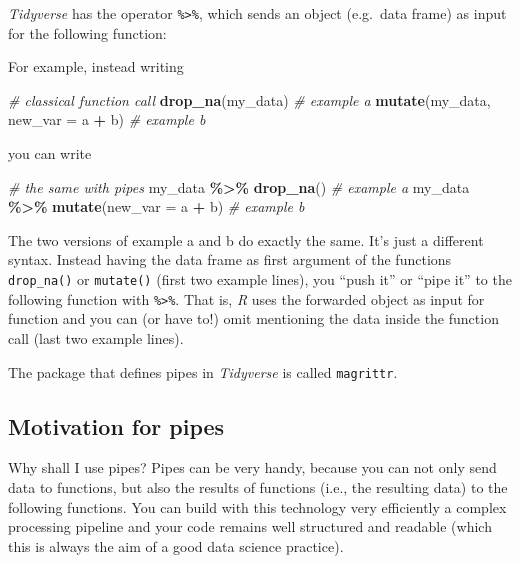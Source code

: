 \documentclass[
]{scrartcl}
\makeatletter
\newenvironment{Shaded}{\begin{snugshade}}{\end{snugshade}}
\newcommand{\AttributeTok}[1]{\textcolor[rgb]{0.13,0.29,0.53}{#1}}
\newcommand{\CommentTok}[1]{\textcolor[rgb]{0.56,0.35,0.01}{\textit{#1}}}
\newcommand{\FunctionTok}[1]{\textcolor[rgb]{0.13,0.29,0.53}{\textbf{#1}}}
\newcommand{\NormalTok}[1]{#1}
\newcommand{\SpecialCharTok}[1]{\textcolor[rgb]{0.81,0.36,0.00}{\textbf{#1}}}
\newenvironment{kframe}{%
\medskip{}
\setlength{\fboxsep}{.8em}
 \def\at@end@of@kframe{}%
 \ifinner\ifhmode%
  \def\at@end@of@kframe{\end{minipage}}%
  \begin{minipage}{\columnwidth}%
 \fi\fi%
 \def\FrameCommand##1{\hskip\@totalleftmargin \hskip-\fboxsep
 \colorbox{shadecolor}{##1}\hskip-\fboxsep
     \hskip-\linewidth \hskip-\@totalleftmargin \hskip\columnwidth}%
 \MakeFramed {\advance\hsize-\width
   \@totalleftmargin\z@ \linewidth\hsize
   \@setminipage}}%
 {\par\unskip\endMakeFramed%
 \at@end@of@kframe}
\newenvironment{rmdblock}[1]
  {
  \begin{itemize}
  \renewcommand{\labelitemi}{
    \raisebox{-.7\height}[0pt][0pt]{
      {\setkeys{Gin}{width=3em,keepaspectratio}\texttt{[image: images/\#1]}}
    }
  }
  \setlength{\fboxsep}{1em}
  \begin{kframe}
  \item
  }
  {
  \end{kframe}
  \end{itemize}
  }
\newenvironment{geek}
    {\begin{rmdblock}{geek}}
    {\end{rmdblock}}
\makeatother
\begin{document}
\emph{Tidyverse} has the operator \texttt{\%\textgreater{}\%}, which sends an object (e.g.~data frame) as input for the following function:

For example, instead writing

\begin{Shaded}
\begin{Highlighting}[]
\CommentTok{\# classical function call}
\FunctionTok{drop\_na}\NormalTok{(my\_data)                }\CommentTok{\# example a}
\FunctionTok{mutate}\NormalTok{(my\_data, }\AttributeTok{new\_var =}\NormalTok{ a }\SpecialCharTok{+}\NormalTok{ b) }\CommentTok{\# example b}
\end{Highlighting}
\end{Shaded}

you can write

\begin{Shaded}
\begin{Highlighting}[]
\CommentTok{\# the same with pipes}
\NormalTok{my\_data }\SpecialCharTok{\%\textgreater{}\%} \FunctionTok{drop\_na}\NormalTok{()                }\CommentTok{\# example a}
\NormalTok{my\_data }\SpecialCharTok{\%\textgreater{}\%} \FunctionTok{mutate}\NormalTok{(}\AttributeTok{new\_var =}\NormalTok{ a }\SpecialCharTok{+}\NormalTok{ b)  }\CommentTok{\# example b}
\end{Highlighting}
\end{Shaded}

The two versions of example a and b do exactly the same. It's just a different syntax. Instead having the data frame as first argument of the functions \texttt{drop\_na()} or \texttt{mutate()} (first two example lines), you ``push it'' or ``pipe it'' to the following function with \texttt{\%\textgreater{}\%}. That is, \emph{R} uses the forwarded object as input for function and you can (or have to!) omit mentioning the data inside the function call (last two example lines).

\begin{geek}
The package that defines pipes in \emph{Tidyverse} is called
\texttt{magrittr}.
\end{geek}

\subsection{Motivation for pipes}\label{motivation-for-pipes}

Why shall I use pipes? Pipes can be very handy, because you can not only send data to functions, but also the results of functions (i.e., the resulting data) to the following functions. You can build with this technology very efficiently a complex processing pipeline and your code remains well structured and readable (which this is always the aim of a good data science practice).
\end{document}

